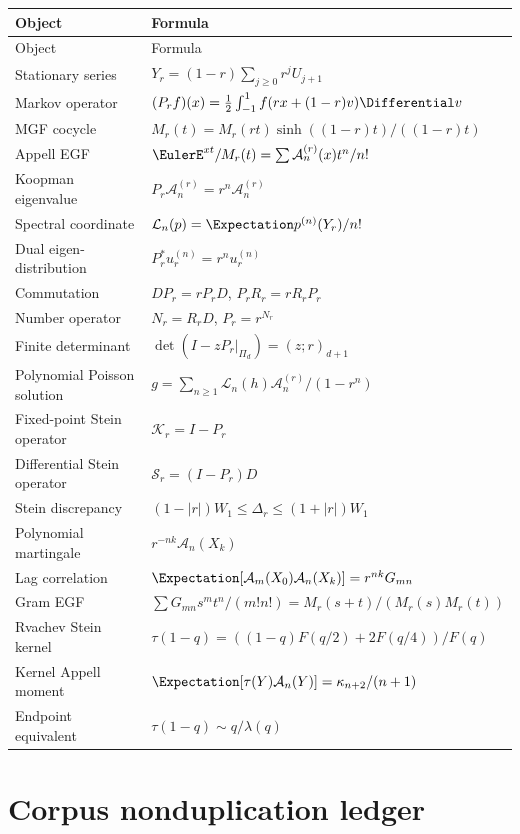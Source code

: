 \documentclass[11pt,a4paper]{article}
\theoremstyle{definition}
\theoremstyle{remark}
\newcommand{\Acal}{\mathcal A}
\newcommand{\Scal}{\mathcal S}
\newcommand{\Lcal}{\mathcal L}
\newcommand{\Kcal}{\mathcal K}
\begin{document}
\begin{longtable}{@{}p{}p{}@{}}
\toprule
Object & Formula \\
\midrule
\endfirsthead
\toprule
Object & Formula \\
\midrule
\endhead
Stationary series & $Y_r=(1-r)\sum_{j\ge0}r^jU_{j+1}$ \\
Markov operator & $(P_rf)(x)=\frac12\int_{-1}^1f(rx+(1-r)v)\Differential v$ \\
MGF cocycle & $M_r(t)=M_r(rt)\sinh((1-r)t)/((1-r)t)$ \\
Appell EGF & $\EulerE^{xt}/M_r(t)=\sum\Acal_n^{(r)}(x)t^n/n!$ \\
Koopman eigenvalue & $P_r\Acal_n^{(r)}=r^n\Acal_n^{(r)}$ \\
Spectral coordinate & $\Lcal_n(p)=\Expectation p^{(n)}(Y_r)/n!$ \\
Dual eigen-distribution & $P_r^*u_r^{(n)}=r^nu_r^{(n)}$ \\
Commutation & $DP_r=rP_rD$, $P_rR_r=rR_rP_r$ \\
Number operator & $N_r=R_rD$, $P_r=r^{N_r}$ \\
Finite determinant & $\det(I-zP_r|_{\Pi_d})=(z;r)_{d+1}$ \\
Polynomial Poisson solution & $g=\sum_{n\ge1}\Lcal_n(h)\Acal_n^{(r)}/(1-r^n)$ \\
Fixed-point Stein operator & $\Kcal_r=I-P_r$ \\
Differential Stein operator & $\Scal_r=(I-P_r)D$ \\
Stein discrepancy & $(1-|r|)W_1\le\Delta_r\le(1+|r|)W_1$ \\
Polynomial martingale & $r^{-nk}\Acal_n(X_k)$ \\
Lag correlation & $\Expectation[\Acal_m(X_0)\Acal_n(X_k)]=r^{nk}G_{mn}$ \\
Gram EGF & $\sum G_{mn}s^mt^n/(m!n!)=M_r(s+t)/(M_r(s)M_r(t))$ \\
Rvachev Stein kernel & $\tau(1-q)=((1-q)F(q/2)+2F(q/4))/F(q)$ \\
Kernel Appell moment & $\Expectation[\tau(Y)\Acal_n(Y)]=\kappa_{n+2}/(n+1)$ \\
Endpoint equivalent & $\tau(1-q)\sim q/\lambda(q)$ \\
\bottomrule
\end{longtable}

\section{Corpus nonduplication ledger}
\label{app:corpus}
\end{document}
